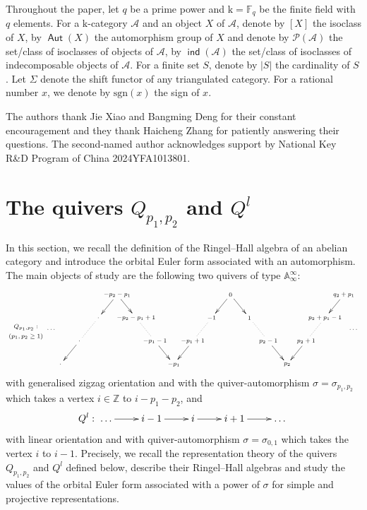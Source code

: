 \documentclass[reqno,12pt,a4paper]{amsart}
\theoremstyle{remark}
\theoremstyle{definition}
\newcommand{\opname}[1]{\operatorname{\mathsf{#1}}}
\newcommand{\ind}{\opname{ind}}
\newcommand{\Aut}{\opname{Aut}}
\newcommand{\ca}{{\mathcal A}}
\newcommand{\cp}{{\mathcal P}}
\newcommand{\fk}{{\mathrm k}}
\numberwithin{equation}{section}
\begin{document}
\smallskip
Throughout the paper, let $q$ be a prime power and $\fk=\mathbb{F}_q$ be the finite field with $q$ elements. For a $\fk$-category $\ca$ and an object $X$ of $\ca$, denote by $[X]$ the isoclass of $X$, by $\Aut(X)$ the automorphism group of $X$ and denote by $\cp(\ca)$ the set/class of isoclasses of objects of $\ca$, by $\ind(\ca)$ the set/class of isoclasses of indecomposable objects of $\ca$.  For a finite set $S$, denote by $|S|$ the cardinality of $S$. Let $\Sigma$ denote the shift functor of any triangulated category. For a rational number $x$, we denote by $\mathrm{sgn}(x)$ the sign of $x$.

\medskip
{} The authors thank Jie Xiao and Bangming Deng for their constant encouragement and they thank Haicheng Zhang for patiently answering their questions. The second-named author acknowledges support by National Key R\&D Program of China 2024YFA1013801.

\section{The quivers $Q_{p_1,p_2}$ and $Q^l$}
\label{s:quiver-generalised-zigzag-linear}
In this section, we recall the definition of the Ringel--Hall algebra of an abelian category and introduce the orbital Euler form associated with an automorphism. The main objects of study are the following two quivers of type $\mathbb{A}_\infty^\infty$:
\[
{\scriptsize
\begin{xy} 0;<0.75pt,0pt>:<0pt,-0.55pt>::
(-25,70) *+{Q_{p_1,p_2}:}="", 
(-25,90) *+{(p_1,p_2\geq 1)}="", 
(15,75) *+{\cdots}="",
(30,150) *+{\cdot}="0",
(60,100) *+{\cdot}="1",
(90,50) *+{\cdot}="2",
(120,0) *+{-p_2-p_1}="3",
(150,50) *+{-p_2-p_1+1}="4",
(180,100) *+{-p_1-1}="5",
(210,150) *+{-p_1}="6",
(240,100) *+{-p_1+1}="7",
(270,50) *+{-1}="8",
(300,0) *+{0}="9",
(330,50) *+{1}="10",
(360,100) *+{p_2-1}="11",
(390,150) *+{p_2}="12",
(420,100) *+{p_2+1}="13",
(450,50) *+{p_2+p_1-1}="14",
(480,0) *+{q_2+p_1}="15",
(495,75) *+{\cdots}="",
"1", {\ar "0"}, "2", {\ar@{.} "1"}, "3", {\ar "2"},
"3", {\ar "4"}, "4", {\ar@{.} "5"}, "5", {\ar "6"},
"7", {\ar "6"}, "8", {\ar@{.} "7"}, "9", {\ar "8"},
"9", {\ar "10"}, "10", {\ar@{.} "11"}, "11", {\ar "12"},
"13", {\ar "12"}, "14", {\ar@{.} "13"}, "15", {\ar "14"},
\end{xy}
}
\]
with generalised zigzag orientation and with the quiver-automorphism $\sigma=\sigma_{p_1,p_2}$ which takes a vertex $i\in\mathbb{Z}$ to $i-p_1-p_2$, and
\[Q^l: \xymatrix{\ldots\ar[r]&i-1\ar[r]&i\ar[r]&i+1\ar[r]&\ldots}\]
with linear orientation and with quiver-automorphism $\sigma=\sigma_{0,1}$ which takes the vertex $i$ to $i-1$. Precisely, we recall the representation theory of the quivers $Q_{p_1,p_2}$ and $Q^l$ defined below, describe their Ringel--Hall algebras and study the values of the orbital Euler form associated with a power of $\sigma$ for simple and projective representations.
\end{document}

